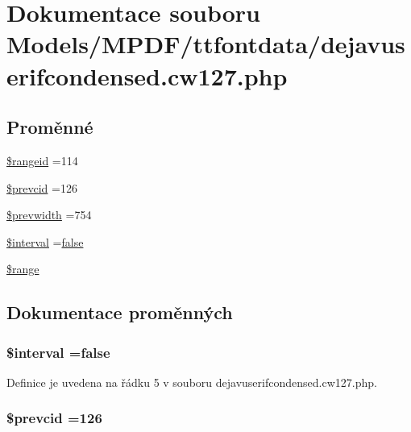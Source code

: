 \hypertarget{dejavuserifcondensed_8cw127_8php}{\section{Dokumentace souboru Models/\-M\-P\-D\-F/ttfontdata/dejavuserifcondensed.cw127.\-php}
\label{dejavuserifcondensed_8cw127_8php}
}
\subsection*{Proměnné}
\begin{DoxyCompactItemize}
\item 
\hyperlink{dejavuserifcondensed_8cw127_8php_a555224809a2d03766193a06c6f4ea061}{\$rangeid} =114
\item 
\hyperlink{dejavuserifcondensed_8cw127_8php_af9586406f81f4c60e4f21823e5af1f1d}{\$prevcid} =126
\item 
\hyperlink{dejavuserifcondensed_8cw127_8php_afc01c27a4bb149f1386368eb7c57f324}{\$prevwidth} =754
\item 
\hyperlink{dejavuserifcondensed_8cw127_8php_a02df6fd14302ba88fecc15b95d513e5b}{\$interval} =\hyperlink{ttfontsuni_8php_afbaa04e5cc97693dc668b3c45d3dd740}{false}
\item 
\hyperlink{dejavuserifcondensed_8cw127_8php_ac2e4b5fa63099d7c943a803ae122dd2b}{\$range}
\end{DoxyCompactItemize}


\subsection{Dokumentace proměnných}
\hypertarget{dejavuserifcondensed_8cw127_8php_a02df6fd14302ba88fecc15b95d513e5b}{
\subsubsection[{\$interval}]{\setlength{\rightskip}{0pt plus 5cm}\$interval ={\bf false}}}\label{dejavuserifcondensed_8cw127_8php_a02df6fd14302ba88fecc15b95d513e5b}


Definice je uvedena na řádku 5 v souboru dejavuserifcondensed.\-cw127.\-php.

\hypertarget{dejavuserifcondensed_8cw127_8php_af9586406f81f4c60e4f21823e5af1f1d}{
\subsubsection[{\$prevcid}]{\setlength{\rightskip}{0pt plus 5cm}\$prevcid =126}}\label{dejavuserifcondensed_8cw127_8php_af9586406f81f4c60e4f21823e5af1f1d}


